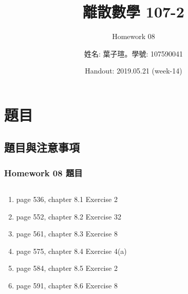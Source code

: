 \documentclass[12pt,hyperref={bookmarks=false}]{beamer}
\title{離散數學 107-2}
\subtitle{Homework 08}
\author{姓名: 葉子瑄。學號: 107590041}
\date{Handout: 2019.05.21 (week-14)}
\begin{document}

\begin{frame}
\titlepage
\end{frame}

\raggedright

\begin{frame}
\footnotesize
\tableofcontents
\end{frame}
	
\section{題目}

	\subsection{題目與注意事項}
	
	\begin{frame}
	\frametitle{Homework 08 題目}
	\fontsize{10pt}{11pt}\selectfont
	\setlength{\baselineskip}{5pt}
	\begin{columns}
	\begin{column}{0.68\textwidth}
	\begin{enumerate}[label=(Prob. \arabic*)]
	\setlength\itemsep{0em}
	\item page 536, chapter 8.1 Exercise 2
	\item page 552, chapter 8.2 Exercise 32
	\item page 561, chapter 8.3 Exercise 8
	\item page 575, chapter 8.4 Exercise 4(a)
	\item page 584, chapter 8.5 Exercise 2
	\item page 591, chapter 8.6 Exercise 8


	\end{enumerate}
	\end{column}
	
	
	\end{columns}
	\end{frame}
	
\end{document}

